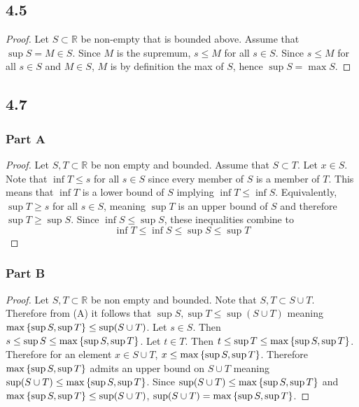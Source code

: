 \documentclass[12pt,titlepage]{extarticle}
\begin{document}
\subsection*{4.5}
\begin{proof}
	Let $S \subset \mathbb{R}$ be non-empty that is bounded above. Assume that $\sup S = M \in S$. Since $M$ is the supremum, $s \leq M$ for all $s \in S$. Since $s \leq M$ for all $s \in S$ and $M \in S$, $M$ is by definition the max of $S$, hence $\sup S = \max S$.
\end{proof}

\subsection*{4.7}
\subsubsection*{Part A}
\begin{proof}
	Let $S, T \subset \mathbb{R}$ be non empty and bounded. Assume that $S \subset T$. Let $x \in S$. Note that $\inf T \leq s$ for all $s \in S$ since every member of $S$ is a member of $T$. This means that $\inf T$ is a lower bound of $S$ implying $\inf T \leq \inf S$. Equivalently, $\sup T \geq s$ for all $s \in S$, meaning $\sup T$ is an upper bound of $S$ and therefore $\sup T \geq \sup S$. Since $\inf S \leq \sup S$, these inequalities combine to
	\[
		\inf T \leq \inf S \leq \sup S \leq \sup T
	\]
\end{proof}

\subsubsection*{Part B}
\begin{proof}
	Let $S, T \subset \mathbb{R}$ be non empty and bounded. Note that $S, T \subset S \cup T$. Therefore from (A) it follows that $\sup S, \sup T \leq \sup(S \cup T)$ meaning $\max\qty{\sup S, \sup T} \leq \sup(S\cup T)$. Let $s \in S$. Then $s \leq \sup S \leq \max\qty{\sup S, \sup T}$. Let $t \in T$. Then $t \leq \sup T \leq \max\qty{\sup S, \sup T}$. Therefore for an element $x \in S \cup T$, $x \leq \max\qty{\sup S, \sup T}$. Therefore $\max\qty{\sup S, \sup T}$ admits an upper bound on $S \cup T$ meaning $\sup(S \cup T) \leq \max\qty{\sup S, \sup T}$. Since $\sup(S \cup T) \leq \max\qty{\sup S, \sup T}$ and $\max\qty{\sup S, \sup T} \leq \sup(S \cup T)$, $\sup(S \cup T) = \max\qty{\sup S, \sup T}$.
\end{proof}
\end{document}
